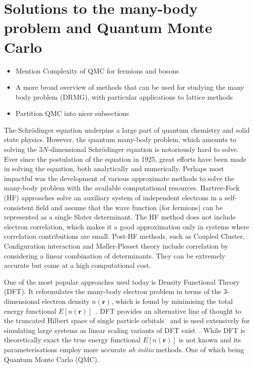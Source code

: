 \newpage
\section{Solutions to the many-body problem and Quantum Monte Carlo}
\label{sec:qmc}

\begin{itemize}
	\item Mention Complexity of QMC for fermions and bosons
	\item A more broad overview of methods that can be used for studying the many body problem (DRMG), with particular applications to lattice methods
	\item Partition QMC into nicer subsections
\end{itemize}

The Schr{\"o}dinger equation underpins a large part of quantum chemistry and solid state physics. However, the quantum many-body problem, which amounts to solving the $3N$-dimensional Schr\"odinger equation is notoriously hard to solve. Ever since the postulation of the equation in 1925, great efforts have been made in solving the equation, both analytically and numerically. Perhaps most impactful was the development of various approximate methods to solve the many-body problem with the available computational resources. Hartree-Fock (HF) approaches solve an auxiliary system of independent electrons in a self-consistent field and assume that the wave function (for fermions) can be represented as a single Slater determinant. The HF method does not include electron correlation, which makes it a good approximation only in systems where correlation contributions are small. Post-HF methods, such as Coupled Cluster, Configuration interaction and M\o ller-Plesset theory include correlation by considering a linear combination of determinants. They can be extremely accurate but come at a high computational cost. 

One of the most popular approaches used today is Density Functional Theory (DFT). It reformulates the many-body electron problem in terms of the $3$-dimensional electron density $n(\mathbf{r})$, which is found by minimising the total energy functional $E[n(\mathbf{r})]$~\cite{hohenberg1964inhomogeneous}. DFT provides an alternative line of thought to the truncated Hilbert space of single particle orbitals~\cite{kohn1999nobel} and is used extensively for simulating large systems as linear scaling variants of DFT exist~\cite{skylaris2005introducing}. 
While DFT is theoretically exact the true energy functional $E[n(\mathbf{r})]$ is not known and its parameterisations employ more accurate \emph{ab initio} methods. One of which being Quantum Monte Carlo (QMC).

